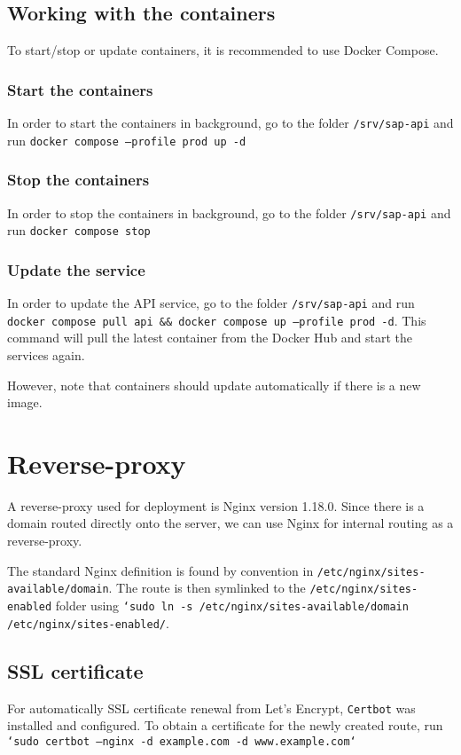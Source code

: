 \subsection{Working with the containers}
To start/stop or update containers, it is recommended to use Docker Compose.
\subsubsection{Start the containers}
In order to start the containers in background, go to the folder \texttt{/srv/sap-api} and run \texttt{docker compose --profile prod up -d}

\subsubsection{Stop the containers}
In order to stop the containers in background, go to the folder \texttt{/srv/sap-api} and run \texttt{docker compose stop}

\subsubsection{Update the service}
In order to update the API service, go to the folder \texttt{/srv/sap-api} and run \texttt{docker compose pull api \&\& docker compose up --profile prod -d}.
This command will pull the latest container from the Docker Hub and start the services again.

However, note that containers should update automatically if there is a new image.

\section{Reverse-proxy}
A reverse-proxy used for deployment is Nginx version 1.18.0.
Since there is a domain routed directly onto the server, we can use Nginx for internal routing as a reverse-proxy.

The standard Nginx definition is found by convention in \texttt{/etc/nginx/sites-available/domain}.
The route is then symlinked to the \texttt{/etc/nginx/sites-enabled} folder using \texttt{`sudo ln -s /etc/nginx/sites-available/domain /etc/nginx/sites-enabled/}.

\subsection{SSL certificate}
For automatically SSL certificate renewal from Let's Encrypt, \texttt{Certbot} was installed and configured.
To obtain a certificate for the newly created route, run \texttt{`sudo certbot --nginx -d example.com -d www.example.com`}






